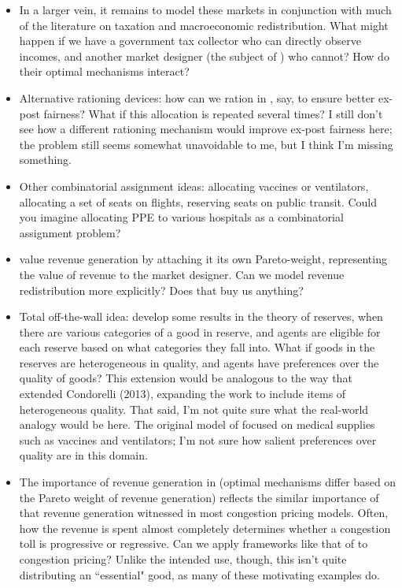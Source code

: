 \documentclass[JEL]{AEA}
\begin{document}
\begin{itemize}    
    \item In a larger vein, it remains to model these markets in conjunction with much of the literature on taxation and macroeconomic redistribution. What might happen if we have a government tax collector who can directly observe incomes, and another market designer (the subject of \cite{akbarpour-2020}) who cannot? How do their optimal mechanisms interact?

    \item Alternative rationing devices: how can we ration in \cite{dworczak-2020}, say, to ensure better ex-post fairness? What if this allocation is repeated several times? I still don't see how a different rationing mechanism would improve ex-post fairness here; the problem still seems somewhat unavoidable to me, but I think I'm missing something.
    
    \item Other combinatorial assignment ideas: allocating vaccines or ventilators, allocating a set of seats on flights, reserving seats on public transit. Could you imagine allocating PPE to various hospitals as a combinatorial assignment problem?
    
    \item \cite{akbarpour-2020} value revenue generation by attaching it its own Pareto-weight, representing the value of revenue to the market designer. Can we model revenue redistribution more explicitly? Does that buy us anything?
    
    \item Total off-the-wall idea: \cite{pathak-2020} develop some results in the theory of reserves, when there are various categories of a good in reserve, and agents are eligible for each reserve based on what categories they fall into. What if goods in the reserves are heterogeneous in quality, and agents have preferences over the quality of goods? This extension would be analogous to the way that \cite{akbarpour-2020} extended Condorelli (2013), expanding the work to include items of heterogeneous quality. That said, I'm not quite sure what the real-world analogy would be here. The original model of \cite{pathak-2020} focused on medical supplies such as vaccines and ventilators; I'm not sure how salient preferences over quality are in this domain.

    \item The importance of revenue generation in \cite{akbarpour-2020} (optimal mechanisms differ based on the Pareto weight of revenue generation) reflects the similar importance of that revenue generation witnessed in most congestion pricing models. Often, how the revenue is spent almost completely determines whether a congestion toll is progressive or regressive. Can we apply frameworks like that of \cite{akbarpour-2020} to congestion pricing? Unlike the intended use, though, this isn't quite distributing an ``essential" good, as many of these motivating examples do.    
\end{itemize}
\end{document}
